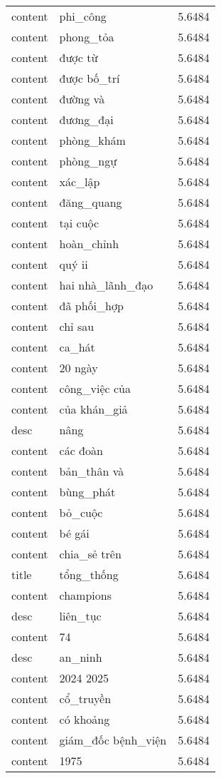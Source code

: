\documentclass{article}
\begin{document}
\begin{tabular}{lll}
content & phi\_công & 5.6484\\
content & phong\_tỏa & 5.6484\\
content & được từ & 5.6484\\
content & được bố\_trí & 5.6484\\
content & đường và & 5.6484\\
content & đương\_đại & 5.6484\\
content & phòng\_khám & 5.6484\\
content & phòng\_ngự & 5.6484\\
content & xác\_lập & 5.6484\\
content & đăng\_quang & 5.6484\\
content & tại cuộc & 5.6484\\
content & hoàn\_chỉnh & 5.6484\\
content & quý ii & 5.6484\\
content & hai nhà\_lãnh\_đạo & 5.6484\\
content & đã phối\_hợp & 5.6484\\
content & chỉ sau & 5.6484\\
content & ca\_hát & 5.6484\\
content & 20 ngày & 5.6484\\
content & công\_việc của & 5.6484\\
content & của khán\_giả & 5.6484\\
desc & nâng & 5.6484\\
content & các đoàn & 5.6484\\
content & bản\_thân và & 5.6484\\
content & bùng\_phát & 5.6484\\
content & bỏ\_cuộc & 5.6484\\
content & bé gái & 5.6484\\
content & chia\_sẻ trên & 5.6484\\
title & tổng\_thống & 5.6484\\
content & champions & 5.6484\\
desc & liên\_tục & 5.6484\\
content & 74 & 5.6484\\
desc & an\_ninh & 5.6484\\
content & 2024 2025 & 5.6484\\
content & cổ\_truyền & 5.6484\\
content & có khoảng & 5.6484\\
content & giám\_đốc bệnh\_viện & 5.6484\\
content & 1975 & 5.6484\\

\end{tabular}
\end{document}
